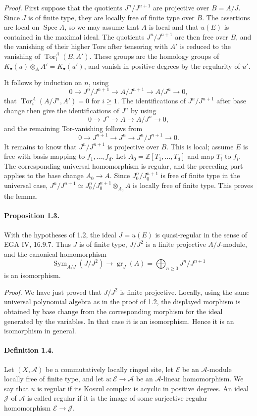 \documentclass[12pt]{article}
\newcommand{\ZZ}{\mathbb Z}
\newcommand{\cA}{\mathcal A}
\newcommand{\cJ}{\mathcal J}
\newcommand{\uE}{\mathcal E}
\newcommand{\Tor}{\operatorname{Tor}}
\newcommand{\Spec}{\operatorname{Spec}}
\newcommand{\Sym}{\operatorname{Sym}}
\newcommand{\gr}{\operatorname{gr}}
\begin{document}
\emph{Proof.} First suppose that the quotients $J^n/J^{n+1}$ are projective over $B=A/J$. Since $J$ is of finite type, they are locally free of finite type over $B$. The assertions are local on $\Spec A$, so we may assume that $A$ is local and that $u(E)$ is contained in the maximal ideal. The quotients $J^n/J^{n+1}$ are then free over $B$, and the vanishing of their higher Tors after tensoring with $A'$ is reduced to the vanishing of $\Tor_i^A(B,A')$. These groups are the homology groups of $K_\bullet(u)\otimes_AA'=K_\bullet(u')$, and vanish in positive degrees by the regularity of $u'$.

It follows by induction on $n$, using
\[
0\to J^n/J^{n+1}\to A/J^{n+1}\to A/J^n\to0,
\]
that $\Tor_i^A(A/J^n,A')=0$ for $i\geq1$. The identifications of $J^n/J^{n+1}$ after base change then give the identifications of $J^n$ by using
\[
0\to J^n\to A\to A/J^n\to0,
\]
and the remaining Tor-vanishing follows from
\[
0\to J^{n+1}\to J^n\to J^n/J^{n+1}\to0.
\]
It remains to know that $J^n/J^{n+1}$ is projective over $B$. This is local; assume $E$ is free with basis mapping to $f_1,\ldots,f_d$. Let $A_0=\ZZ[T_1,\ldots,T_d]$ and map $T_i$ to $f_i$. The corresponding universal homomorphism is regular, and the preceding part applies to the base change $A_0\to A$. Since $J_0^n/J_0^{n+1}$ is free of finite type in the universal case, $J^n/J^{n+1}\simeq J_0^n/J_0^{n+1}\otimes_{A_0}A$ is locally free of finite type. This proves the lemma.

\paragraph{Proposition 1.3.} With the hypotheses of 1.2, the ideal $J=u(E)$ is quasi-regular in the sense of EGA IV, 16.9.7. Thus $J$ is of finite type, $J/J^2$ is a finite projective $A/J$-module, and the canonical homomorphism
\[
\Sym_{A/J}(J/J^2)\longrightarrow \gr_J(A)=\bigoplus_{n\geq0}J^n/J^{n+1}
\]
is an isomorphism.

\emph{Proof.} We have just proved that $J/J^2$ is finite projective. Locally, using the same universal polynomial algebra as in the proof of 1.2, the displayed morphism is obtained by base change from the corresponding morphism for the ideal generated by the variables. In that case it is an isomorphism. Hence it is an isomorphism in general.

\paragraph{Definition 1.4.} Let $(X,\cA)$ be a commutatively locally ringed site, let $\uE$ be an $\cA$-module locally free of finite type, and let $u:\uE\to\cA$ be an $\cA$-linear homomorphism. We say that $u$ is regular if its Koszul complex is acyclic in positive degrees. An ideal $\cJ$ of $\cA$ is called regular if it is the image of some surjective regular homomorphism $\uE\to\cJ$.
\end{document}
